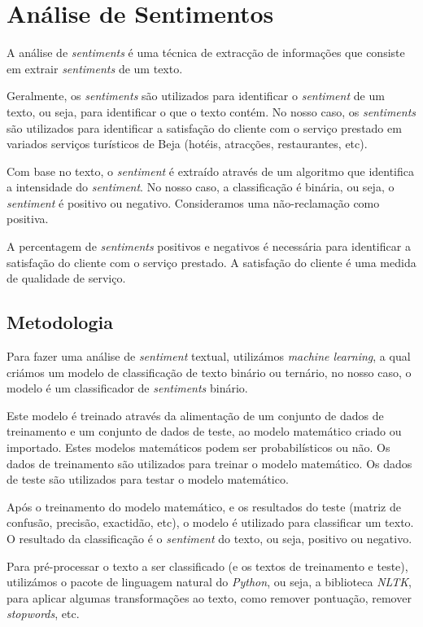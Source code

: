 \chapter{Análise de Sentimentos}
\label{cap6}

A análise de \textit{sentiments} é uma técnica de extracção de informações que consiste em extrair \textit{sentiments} de um texto.

Geralmente, os \textit{sentiments} são utilizados para identificar o \textit{sentiment} de um texto, ou seja, para identificar o que o texto contém. No nosso caso, os \textit{sentiments} são utilizados para identificar a satisfação do cliente com o serviço prestado em variados serviços turísticos de Beja (hotéis, atracções, restaurantes, etc).

Com base no texto, o \textit{sentiment} é extraído através de um algoritmo que identifica a intensidade do \textit{sentiment}. No nosso caso, a classificação é binária, ou seja, o \textit{sentiment} é positivo ou negativo. Consideramos uma não-reclamação como positiva.

A percentagem de \textit{sentiments} positivos e negativos é necessária para identificar a satisfação do cliente com o serviço prestado. A satisfação do cliente é uma medida de qualidade de serviço.

\section{Metodologia}

Para fazer uma análise de \textit{sentiment} textual, utilizámos \textit{machine learning}, a qual criámos um modelo de classificação de texto binário ou ternário, no nosso caso, o modelo é um classificador de \textit{sentiments} binário.

Este modelo é treinado através da alimentação de um conjunto de dados de treinamento e um conjunto de dados de teste, ao modelo matemático criado ou importado. Estes modelos matemáticos podem ser probabilísticos ou não. Os dados de treinamento são utilizados para treinar o modelo matemático. Os dados de teste são utilizados para testar o modelo matemático.

Após o treinamento do modelo matemático, e os resultados do teste (matriz de confusão, precisão, exactidão, etc), o modelo é utilizado para classificar um texto. O resultado da classificação é o \textit{sentiment} do texto, ou seja, positivo ou negativo.

Para pré-processar o texto a ser classificado (e os textos de treinamento e teste), utilizámos o pacote de linguagem natural do \textit{Python}, ou seja, a biblioteca \textit{NLTK}, para aplicar algumas transformações ao texto, como remover pontuação, remover \textit{stopwords}, etc.

